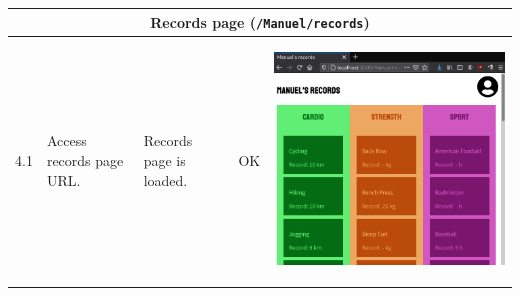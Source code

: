 \documentclass[12pt,twoside,titlepage,a4paper]{article}
\theoremstyle{definicion}
\theoremstyle{lema}
\theoremstyle{teorema}
\theoremstyle{corolario}
\theoremstyle{ejemplo}
\theoremstyle{nota}
\begin{document}
\begin{table}[!h]
\begin{tabular}{|m{0.6cm}|m{2.9cm}|m{3.6cm}|m{1.1cm}|m{5.9cm}|}
		\hline
		\multicolumn{5}{|c|}{\textbf{Records page} (\texttt{/Manuel/records})} \\ 
		\hline
		4.1 & Access records page URL. & Records page is loaded. & OK &
		\begin{center}\includegraphics[scale=0.22]{records.png}\end{center} \\
		\hline
	\end{tabular}
\end{table}
\newpage
\end{document}
